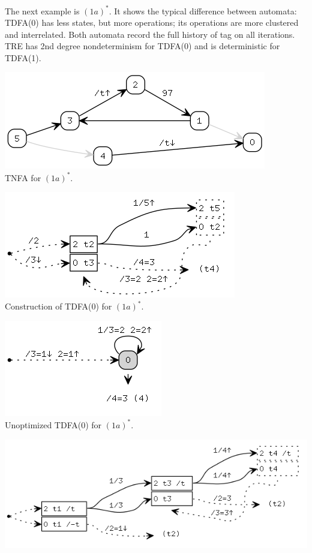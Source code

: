 \documentclass{article}
\theoremstyle{definition}
\begin{document}
\begin{multicols}{2}
The next example is $(1 a)^*$.
It shows the typical difference between automata:
TDFA(0) has less states, but more operations; its operations are more clustered and interrelated.
Both automata record the full history of tag on all iterations.
TRE has 2nd degree nondeterminism for TDFA(0) and is deterministic for TDFA(1).
\begin{center}
\includegraphics[width=0.6\linewidth]{img/example6/tnfa.png}\\
\footnotesize{TNFA for $(1 a)^*$.} \\
\end{center}
\begin{center}
\includegraphics[width=0.6\linewidth]{img/example6/tdfa0_raw.png}\\
\footnotesize{Construction of TDFA(0) for $(1 a)^*$.} \\
\end{center}
\begin{center}
\includegraphics[width=0.5\linewidth]{img/example6/tdfa0.png}\\
\footnotesize{Unoptimized TDFA(0) for $(1 a)^*$.} \\
\end{center}
\begin{center}
\includegraphics[width=0.9\linewidth]{img/example6/tdfa1_raw.png}\\

\end{center}
\end{multicols}
\end{document}
